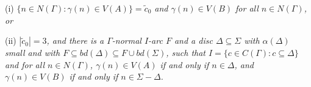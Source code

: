 \hspace*{12pt}(i) \textit{$\{n \in N(\Gamma) : \gamma(n) \in V(A)\} = \tilde{c}_0$ and $\gamma(n) \in V(B)$ for all $n \in N(\Gamma)$, or}

\hspace*{12pt}(ii) \textit{$|\tilde{c}_0| = 3$, and there is a $\Gamma$-normal $I$-arc $F$ and a disc $\Delta \subseteq \Sigma$ with $\alpha(\Delta)$ small and with $F \subseteq bd(\Delta) \subseteq F \cup bd(\Sigma)$, such that $I = \{c \in C(\Gamma) : c \subseteq \Delta\}$ and for all $n \in N(\Gamma)$, $\gamma(n) \in V(A)$ if and only if $n \in \Delta$, and $\gamma(n) \in V(B)$ if and only if $n \in \Sigma - \Delta$.}
